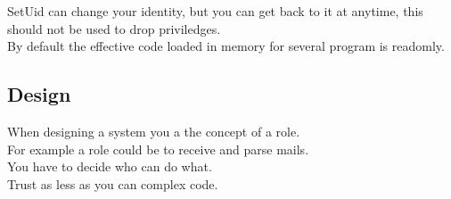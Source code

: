 \documentclass[a4paper,11pt]{article}
\begin{document}
SetUid can change your identity, but you can get back to it at anytime, this should not be used to drop priviledges.\\
By default the effective code loaded in memory for several program is readomly.

\subsection{Design}
When designing a system you a the concept of a role.\\
For example a role could be to receive and parse mails.\\

You have to decide who can do what.\\
Trust as less as you can complex code.\\

 
\end{document}

